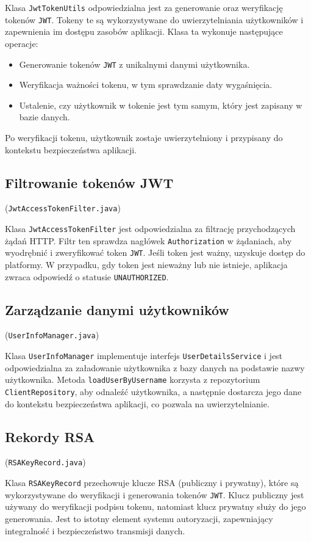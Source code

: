 Klasa \texttt{JwtTokenUtils} odpowiedzialna jest za generowanie oraz weryfikację tokenów \texttt{JWT}. Tokeny te są wykorzystywane do uwierzytelniania użytkowników i zapewnienia im dostępu zasobów aplikacji. Klasa ta wykonuje następujące operacje:
\begin{itemize}
    \item Generowanie tokenów \texttt{JWT} z unikalnymi danymi użytkownika.
    \item Weryfikacja ważności tokenu, w tym sprawdzanie daty wygaśnięcia.
    \item Ustalenie, czy użytkownik w tokenie jest tym samym, który jest zapisany w bazie danych.
\end{itemize}
Po weryfikacji tokenu, użytkownik zostaje uwierzytelniony i przypisany do kontekstu bezpieczeństwa aplikacji.

\subsection{Filtrowanie tokenów JWT} (\texttt{JwtAccessTokenFilter.java})

Klasa \texttt{JwtAccessTokenFilter} jest odpowiedzialna za filtrację przychodzących żądań HTTP. Filtr ten sprawdza nagłówek \texttt{Authorization} w żądaniach, aby wyodrębnić i zweryfikować token \texttt{JWT}. Jeśli token jest ważny, uzyskuje dostęp do platformy. W przypadku, gdy token jest nieważny lub nie istnieje, aplikacja zwraca odpowiedź o statusie \texttt{UNAUTHORIZED}.

\subsection{Zarządzanie danymi użytkowników} (\texttt{UserInfoManager.java})

Klasa \texttt{UserInfoManager} implementuje interfejs \texttt{UserDetailsService} i jest odpowiedzialna za załadowanie użytkownika z bazy danych na podstawie nazwy użytkownika. Metoda \texttt{loadUserByUsername} korzysta z repozytorium \texttt{ClientRepository}, aby odnaleźć użytkownika, a następnie dostarcza jego dane do kontekstu bezpieczeństwa aplikacji, co pozwala na uwierzytelnianie.

\subsection{Rekordy RSA} (\texttt{RSAKeyRecord.java})

Klasa \texttt{RSAKeyRecord} przechowuje klucze RSA (publiczny i prywatny), które są wykorzystywane do weryfikacji i generowania tokenów \texttt{JWT}. Klucz publiczny jest używany do weryfikacji podpisu tokenu, natomiast klucz prywatny służy do jego generowania. Jest to istotny element systemu autoryzacji, zapewniający integralność i bezpieczeństwo transmisji danych.

